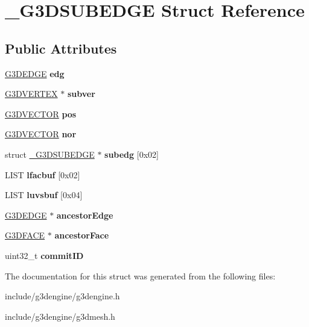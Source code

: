 \hypertarget{struct__G3DSUBEDGE}{}\section{\+\_\+\+G3\+D\+S\+U\+B\+E\+D\+GE Struct Reference}
\label{struct__G3DSUBEDGE}
\subsection*{Public Attributes}
\begin{DoxyCompactItemize}
\item 
\mbox{\label{struct__G3DSUBEDGE_ae4e3fc7c83f2a4b9f8a42e32882fc8d8}} 
\hyperlink{struct__G3DEDGE}{G3\+D\+E\+D\+GE} {\bfseries edg}
\item 
\mbox{\label{struct__G3DSUBEDGE_a23fe4cc9d147fcab1c701c1e17b4744c}} 
\hyperlink{struct__G3DVERTEX}{G3\+D\+V\+E\+R\+T\+EX} $\ast$ {\bfseries subver}
\item 
\mbox{\label{struct__G3DSUBEDGE_af16e2e4e83882929fbf4254f88729f36}} 
\hyperlink{struct__G3DVECTOR}{G3\+D\+V\+E\+C\+T\+OR} {\bfseries pos}
\item 
\mbox{\label{struct__G3DSUBEDGE_ac83cdd7c4f9d947aa67addc9698ffa45}} 
\hyperlink{struct__G3DVECTOR}{G3\+D\+V\+E\+C\+T\+OR} {\bfseries nor}
\item 
\mbox{\label{struct__G3DSUBEDGE_a01643fc4cb82667f453ad9b6b363ab02}} 
struct \hyperlink{struct__G3DSUBEDGE}{\+\_\+\+G3\+D\+S\+U\+B\+E\+D\+GE} $\ast$ {\bfseries subedg} \mbox{[}0x02\mbox{]}
\item 
\mbox{\label{struct__G3DSUBEDGE_aba03b0fd835ec3aad305c93f65a5ae0e}} 
L\+I\+ST {\bfseries lfacbuf} \mbox{[}0x02\mbox{]}
\item 
\mbox{\label{struct__G3DSUBEDGE_ad5e2e99d4a1a10f62d3f32ce224fb1bb}} 
L\+I\+ST {\bfseries luvsbuf} \mbox{[}0x04\mbox{]}
\item 
\mbox{\label{struct__G3DSUBEDGE_a7821756eccbd77057dc9637e3ca10250}} 
\hyperlink{struct__G3DEDGE}{G3\+D\+E\+D\+GE} $\ast$ {\bfseries ancestor\+Edge}
\item 
\mbox{\label{struct__G3DSUBEDGE_ac04f80f033f43d682afccb5cb8585e91}} 
\hyperlink{struct__G3DFACE}{G3\+D\+F\+A\+CE} $\ast$ {\bfseries ancestor\+Face}
\item 
\mbox{\label{struct__G3DSUBEDGE_af70bbb5210ade43fba35c0f2c31b2588}} 
uint32\+\_\+t {\bfseries commit\+ID}
\end{DoxyCompactItemize}


The documentation for this struct was generated from the following files\+:\begin{DoxyCompactItemize}
\item 
include/g3dengine/g3dengine.\+h\item 
include/g3dengine/g3dmesh.\+h\end{DoxyCompactItemize}
